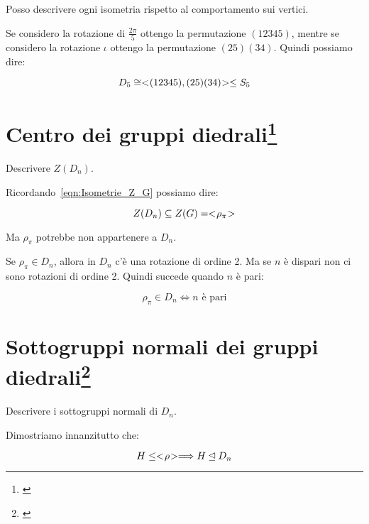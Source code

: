 Posso descrivere ogni isometria rispetto al comportamento sui vertici.

Se considero la rotazione di $\frac{2\pi}{5}$ ottengo la permutazione $(12345)$, mentre se considero la rotazione $\iota$ ottengo la permutazione $(25)(34)$. Quindi possiamo dire:

\begin{equation}
	D_5 \cong < \negmedspace (12345), (25)(34) \negmedspace > \le S_5
\end{equation}

\section[Centro dei gruppi diedrali]{Centro dei gruppi diedrali\footnote{\cite[8 novembre 2021]{lucchini}}}

\begin{esercizio}
	Descrivere $Z(D_n)$.
\end{esercizio}

	Ricordando~\eqref{eqn:Isometrie_Z_G} possiamo dire:
	
	\begin{equation}
		Z(D_n) \subseteq Z(G) = < \negmedspace \rho_\pi \negmedspace >
	\end{equation}

	Ma $\rho_\pi$ potrebbe non appartenere a $D_n$.
	
	Se $\rho_\pi \in D_n$, allora in $D_n$ c'è una rotazione di ordine 2. Ma se $n$ è dispari non ci sono rotazioni di ordine 2. Quindi succede quando $n$ è pari:
	
	\begin{equation}
		\rho_\pi \in D_n \Longleftrightarrow n \text{ è pari}
	\end{equation}

\section[Sottogruppi normali dei gruppi diedrali]{Sottogruppi normali dei gruppi diedrali\footnote{\cite[8 novembre 2021]{lucchini}}}

\begin{esercizio}
	Descrivere i sottogruppi normali di $D_n$.
\end{esercizio}

	Dimostriamo innanzitutto che:
	
	\begin{equation}
		H \le < \negmedspace \rho \negmedspace > \Longrightarrow H \unlhd D_n
	\end{equation}

